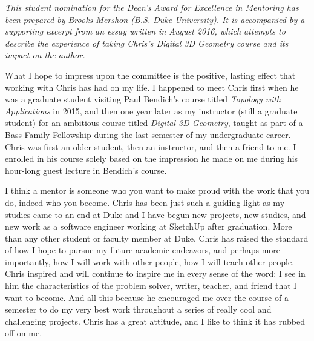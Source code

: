 \documentclass[a4paper, 11pt]{article} %
\begin{document}
\textit{This student nomination for the Dean’s Award for Excellence in Mentoring has been prepared by Brooks Mershon (B.S. Duke University). It is accompanied by a supporting excerpt from an essay written in August 2016, which attempts to describe the experience of taking Chris’s \textit{Digital 3D Geometry} course and its impact on the author.}

\bigskip

What I hope to impress upon the committee is the positive, lasting effect that working with Chris has had on my life. I happened to meet Chris first when he was a graduate student visiting Paul Bendich's course titled \textit{Topology with Applications} in 2015, and then one year later as my instructor (still a graduate student) for an ambitious course titled \textit{Digital 3D Geometry}, taught as part of a Bass Family Fellowship during the last semester of my undergraduate career. Chris was first an older student, then an instructor, and then a friend to me. I enrolled in his course solely based on the impression he made on me during his hour-long guest lecture in Bendich’s course.


I think a mentor is someone who you want to make proud with the work that you do, indeed who you become. Chris has been just such a guiding light as my studies came to an end at Duke and I have begun new projects, new studies, and new work as a software engineer working at SketchUp after graduation. More than any other student or faculty member at Duke, Chris has raised the standard of how I hope to pursue my future academic endeavors, and perhaps more importantly, how I will work with other people, how I will teach other people. Chris inspired and will continue to inspire me in every sense of the word: I see in him the characteristics of the problem solver, writer, teacher, and friend that I want to become. And all this because he encouraged me over the course of a semester to do my very best work throughout a series of really cool and challenging projects. Chris has a great attitude, and I like to think it has rubbed off on me.
\end{document}
